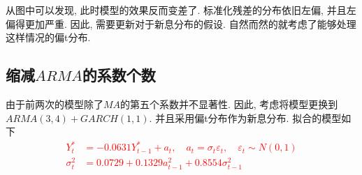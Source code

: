 \documentclass[11pt]{article}
\begin{document}
\qquad 从图中可以发现, 此时模型的效果反而变差了. 标准化残差的分布依旧左偏, 并且左偏得更加严重. 因此, 需要更新对于新息分布的假设. 自然而然的就考虑了能够处理这样情况的偏t分布.

\subsection{缩减$ARMA$的系数个数}
\qquad 由于前两次的模型除了$MA$的第五个系数并不显著性. 因此, 考虑将模型更换到$ARMA(3,4)+GARCH(1,1)$. 并且采用偏t分布作为新息分布. 拟合的模型如下
\textcolor{red}{
\begin{equation*}\begin{aligned}
    Y_{t}^{*} &=-0.0631 Y_{t-1}^{*}+a_{t}, \quad a_{t}=\sigma_{t} \varepsilon_{t}, \quad \varepsilon_{t} \sim N(0,1) \\
    \sigma_{t}^{2} &=0.0729+ 0.1329 a_{t-1}^{2}+ 0.8554 \sigma_{t-1}^{2}
\end{aligned}\end{equation*}}
\end{document}
